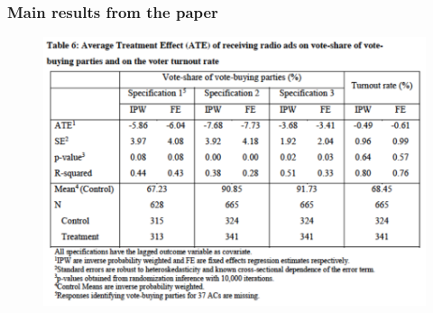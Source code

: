 \documentclass{beamer}
\begin{document}
\begin{frame}
\frametitle{Main results from the paper}

\begin{figure}
\centering
\includegraphics[width=.8\textwidth]{../Figures/table6.pdf}
\end{figure}

\end{frame}
\end{document}
